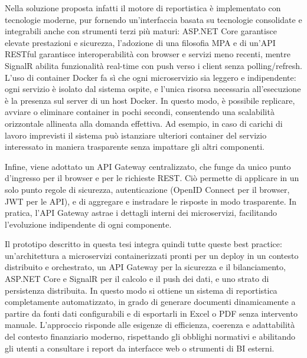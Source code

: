 Nella soluzione proposta infatti il motore di reportistica è implementato con tecnologie moderne, pur fornendo un'interfaccia basata su tecnologie consolidate e integrabili anche con strumenti terzi più maturi: ASP.NET Core garantisce elevate prestazioni e sicurezza, l'adozione di una filosofia MPA e di un'API RESTful garantisce interoperabilità con browser e servizi meno recenti, mentre SignalR abilita funzionalità real-time con push verso i client senza polling/refresh.
L’uso di container Docker fa sì che ogni microservizio sia leggero e indipendente: ogni servizio è isolato dal sistema ospite, e l'unica risorsa necessaria all'esecuzione è la presenza sul server di un host Docker. In questo modo, è possibile replicare, avviare o eliminare container in pochi secondi, consentendo una scalabilità orizzontale allineata alla domanda effettiva. Ad esempio, in caso di carichi di lavoro imprevisti il sistema può istanziare ulteriori container del servizio interessato in maniera trasparente senza impattare gli altri componenti.

Infine, viene adottato un API Gateway centralizzato, che funge da unico punto d'ingresso per il browser e per le richieste REST. Ciò permette di applicare in un solo punto regole di sicurezza, autenticazione (OpenID Connect per il browser, JWT per le API), e di aggregare e instradare le risposte in modo trasparente. In pratica, l’API Gateway astrae i dettagli interni dei microservizi, facilitando l’evoluzione indipendente di ogni componente.

Il prototipo descritto in questa tesi integra quindi tutte queste best practice: un’architettura a microservizi containerizzati pronti per un deploy in un contesto distribuito e orchestrato, un API Gateway per la sicurezza e il bilanciamento, ASP.NET Core e SignalR per il calcolo e il push dei dati, e uno strato di persistenza distribuita. In questo modo si ottiene un sistema di reportistica completamente automatizzato, in grado di generare documenti dinamicamente a partire da fonti dati configurabili e di esportarli in Excel o PDF senza intervento manuale. L’approccio risponde alle esigenze di efficienza, coerenza e adattabilità del contesto finanziario moderno, rispettando gli obblighi normativi e abilitando gli utenti a consultare i report da interfacce web o strumenti di BI esterni.
